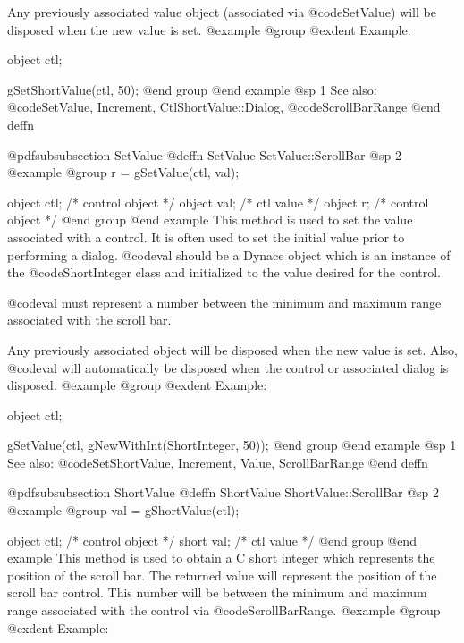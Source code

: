 Any previously associated value object (associated via @code{SetValue})
will be disposed when the new value is set.
@example
@group
@exdent Example:

object  ctl;

gSetShortValue(ctl, 50);
@end group
@end example
@sp 1
See also:  @code{SetValue, Increment, CtlShortValue::Dialog,}
        @code{ScrollBarRange}
@end deffn













@pdfsubsubsection {SetValue}
@deffn {SetValue} SetValue::ScrollBar
@sp 2
@example
@group
r = gSetValue(ctl, val);

object  ctl;    /*  control object  */
object  val;    /*  ctl value       */
object  r;      /*  control object  */
@end group
@end example
This method is used to set the value associated with a control.  It is
often used to set the initial value prior to performing a dialog.
@code{val} should be a Dynace object which is an instance of the
@code{ShortInteger} class and initialized to the value desired for the
control.

@code{val} must represent a number between the minimum and maximum range
associated with the scroll bar.

Any previously associated object will be disposed when the new value is set.
Also, @code{val} will automatically be disposed when the control or associated
dialog is disposed.
@example
@group
@exdent Example:

object  ctl;

gSetValue(ctl, gNewWithInt(ShortInteger, 50));
@end group
@end example
@sp 1
See also:  @code{SetShortValue, Increment, Value, ScrollBarRange}
@end deffn













@pdfsubsubsection {ShortValue}
@deffn {ShortValue} ShortValue::ScrollBar
@sp 2
@example
@group
val = gShortValue(ctl);

object  ctl;   /*  control object  */
short   val;   /*  ctl value       */
@end group
@end example
This method is used to obtain a C short integer which represents the
position of the scroll bar.  The returned value will represent the
position of the scroll bar control.  This number will be between the
minimum and maximum range associated with the control via
@code{ScrollBarRange}.
@example
@group
@exdent Example:

